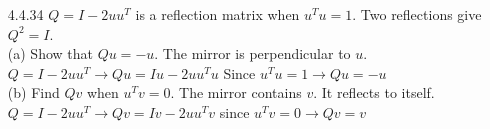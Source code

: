 \documentclass[10pt,twoside,reqno]{article}
\begin{document}
\begin{enumerate}
\item[4.4.34] $Q = I - 2uu^T$ is a reflection matrix when $u^Tu = 1$. Two reflections give $Q^2 = I$.\\
(a) Show that $Qu = -u$. The mirror is perpendicular to $u$.\\
\vspace{3mm}
$Q = I - 2uu^T \rightarrow Qu = Iu - 2uu^Tu$ Since $u^Tu = 1 \rightarrow Qu = -u$\\
\vspace{3mm}
(b) Find $Qv$ when $u^Tv = 0$. The mirror contains $v$. It reflects to itself.\\
\vspace{3mm}
$Q = I - 2uu^T \rightarrow Qv = Iv - 2uu^Tv$ since $u^Tv = 0 \rightarrow Qv = v$
\vspace{3mm}
\end{enumerate}
\end{document}
